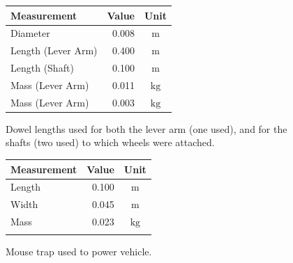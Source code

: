 \documentclass[a4paper]{article}
\begin{document}
\begin{figure}[h]
	\centering
	\begin{minipage}[t]{0.45\textwidth}
		\centering
		\begin{tabular}{p{3.5cm}rc}
			\toprule
			Measurement & Value & Unit \\
			\midrule
			Diameter & 0.008 & $\si{\meter}$ \\
			Length (Lever Arm) & 0.400 & $\si{\meter}$ \\
			Length (Shaft) & 0.100 & $\si{\meter}$ \\
			Mass (Lever Arm) & 0.011 & $\si{\si{\kilogram}}$ \\
			Mass (Lever Arm) & 0.003 & $\si{\si{\kilogram}}$ \\
			\bottomrule
		\end{tabular}
		
		\vspace{0.5cm}
		
		\caption{Dowel lengths used for both the lever arm (one used), and for the shafts (two used) to which wheels were attached.}
	\end{minipage}
	\hspace{1cm}
	\begin{minipage}[t]{0.45\textwidth}
		\centering
		\begin{tabular}{p{3.5cm}rc}
			\toprule
			Measurement & Value & Unit \\
			\midrule
			Length & 0.100 & $\si{\meter}$ \\
			Width & 0.045 & $\si{\meter}$ \\
			Mass & 0.023 & $\si{\kilogram}$ \\
			 & & \\
			\bottomrule
		\end{tabular}
		
		\vspace{0.5cm}
		
		\caption{Mouse trap used to power vehicle.}
	\end{minipage}
\end{figure}
\end{document}
